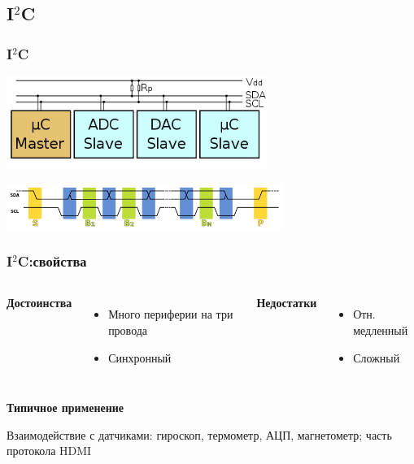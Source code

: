 \subsection{I$^2$C}   
\begin{frame}
  \frametitle{I$^2$C}
  \begin{center}
    \includegraphics[height=3cm]{./slides/hardware_protocols/I2C.png}
    \vspace{0.3cm}

    \includegraphics[height=1.5cm]{./slides/hardware_protocols/600px-I2C_data_transfer.png}
  \end{center}
\end{frame}

\begin{frame}
  \frametitle{I$^2$C:свойства}
  \begin{columns}
    \column{4cm}
    \begin{center}
      {\bf\large Достоинства}
    \end{center}
    \begin{itemize}
       \item Много периферии на три провода
       \item Синхронный
    \end{itemize}
    \column{4cm}
    \begin{center}
      {\bf\large Недостатки}
    \end{center}
    \begin{itemize}
       \item Отн. медленный
       \item Сложный
    \end{itemize}
  \end{columns}
  \begin{center}
    {\bf\large Типичное применение}
  \end{center}
  Взаимодействие с датчиками: гироскоп, термометр, АЦП, магнетометр; часть протокола HDMI
\end{frame}
